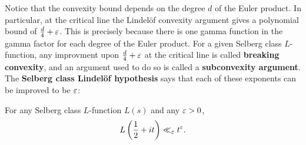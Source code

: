    Notice that the convexity bound depends on the degree $d$ of the Euler product. In particular, at the critical line the Lindel\"of convexity argument gives a polynomial bound of $\frac{d}{4}+\varepsilon$. This is precisely because there is one gamma function in the gamma factor for each degree of the Euler product. For a given Selberg class $L$-function, any improvment upon $\frac{d}{4}+\varepsilon$ at the critical line is called \textbf{breaking convexity}, and an argument used to do so is called a \textbf{subconvexity argument}. The \textbf{Selberg class Lindel\"of hypothesis} says that each of these exponents can be improved to be $\varepsilon$:

    \begin{conjecture}
      For any Selberg class $L$-function $L(s)$ and any $\varepsilon > 0$,
      \[
        L\left(\frac{1}{2}+it\right) \ll_{\varepsilon} t^{\varepsilon}.
      \]
    \end{conjecture}